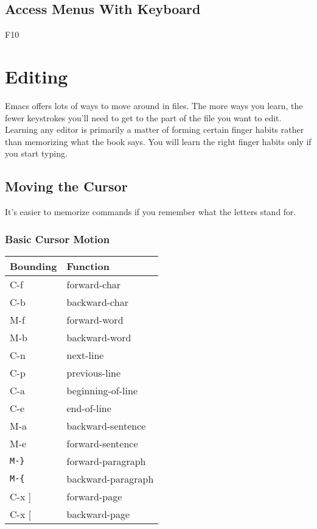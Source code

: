 \documentclass{book}
\newcommand{\head}[1]{\textnormal{\textbf{#1}}}
\begin{document}
\section{Access Menus With Keyboard}
F10


\chapter{Editing}

Emacs offers lots of ways to move around in files.
The more ways you learn, the fewer keystrokes you'll need to get to the part of the file you want to edit.
Learning any editor is primarily a matter of forming certain finger habits rather than memorizing what the book says.
You will learn the right finger habits only if you start typing.

\section{Moving the Cursor}
It's easier to memorize commands if you remember what the letters stand for.
\subsection{Basic Cursor Motion}
\begin{tabular}{ll}
  \toprule[1.5pt]
  \head{Bounding} & \head{Function} \\
  \midrule
  C-f & forward-char \\
  C-b & backward-char \\
  M-f & forward-word \\
  M-b & backward-word \\
  \midrule
  C-n & next-line \\
  C-p      & previous-line      \\
  \midrule
  C-a      & beginning-of-line  \\
  C-e      & end-of-line        \\
  M-a      & backward-sentence  \\
  M-e      & forward-sentence   \\
  \midrule
  \verb|M-}|      & forward-paragraph  \\
  \verb|M-{|      & backward-paragraph \\
  \midrule
  C-x ]    & forward-page       \\
  C-x [    & backward-page      \\
  \bottomrule[1.5pt]
\end{tabular}
\end{document}
